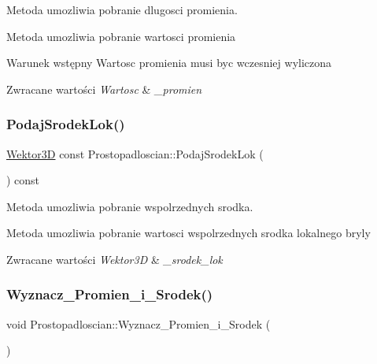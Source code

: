 Metoda umozliwia pobranie dlugosci promienia. 

Metoda umozliwia pobranie wartosci promienia \begin{DoxyPrecond}{Warunek wstępny}
Wartosc promienia musi byc wczesniej wyliczona 
\end{DoxyPrecond}

\begin{DoxyRetVals}{Zwracane wartości}
{\em Wartosc} & {\itshape \+\_\+promien} \\
\hline
\end{DoxyRetVals}
\mbox{\label{classProstopadloscian_ab9c86b023b990acffe00891c17ee596c}} 
\subsubsection{\texorpdfstring{Podaj\+Srodek\+Lok()}{PodajSrodekLok()}}
{\footnotesize\ttfamily \hyperlink{classSWektor}{Wektor3D} const Prostopadloscian\+::\+Podaj\+Srodek\+Lok (\begin{DoxyParamCaption}{ }\end{DoxyParamCaption}) const\hspace{0.3cm}{\ttfamily [inline]}}



Metoda umozliwia pobranie wspolrzednych srodka. 

Metoda umozliwia pobranie wartosci wspolrzednych srodka lokalnego bryly 
\begin{DoxyRetVals}{Zwracane wartości}
{\em Wektor3D} & {\itshape \+\_\+srodek\+\_\+lok} \\
\hline
\end{DoxyRetVals}
\mbox{\label{classProstopadloscian_a148c8e01a4610bd61081b49789d3bc71}} 
\subsubsection{\texorpdfstring{Wyznacz\+\_\+\+Promien\+\_\+i\+\_\+\+Srodek()}{Wyznacz\_Promien\_i\_Srodek()}}
{\footnotesize\ttfamily void Prostopadloscian\+::\+Wyznacz\+\_\+\+Promien\+\_\+i\+\_\+\+Srodek (\begin{DoxyParamCaption}{ }\end{DoxyParamCaption})}



